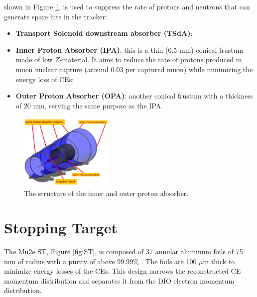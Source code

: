 shown in 
Figure \ref{fig:absorbersDS}, is used to suppress 
the rate of protons and neutrons that can generate spare hits in the 
tracker:
\begin{itemize}
\item \textbf{Transport Solenoid downstream absorber (TSdA)}:

    \item \textbf{Inner Proton Absorber (IPA)}: this is a thin (0.5 mm) conical 
    frustum made of low $Z$-material. It aims to reduce the rate of protons produced 
    in muon nuclear capture (around 0.03 per captured muon) while minimizing the 
    energy loss of CEs;
    \item \textbf{Outer Proton Absorber (OPA)}: another conical frustum with a 
    thickness of 20 mm, serving the same purpose as the IPA.
\end{itemize}
\begin{figure}[!h]
    \centering
    \includegraphics[width =0.4\textwidth]{figures/png/Screenshot_20240706_132949.png}
    \caption[The structure of the inner and outer proton absorber.]{The structure of the inner and outer proton absorber.}
    \label{fig:absorbersDS}
    \end{figure}




\section{Stopping Target}
The Mu2e ST, Figure \ref{fig:ST}, is 
composed of 37 annular aluminum foils of 75 mm of radius with a purity of 
above 99.99\% \cite{bobbb}. The foils are 100 $\mu$m thick to minimize energy losses of the CEs. This design 
narrows the reconstructed CE momentum distribution 
and separates it from the DIO electron momentum distribution. 

